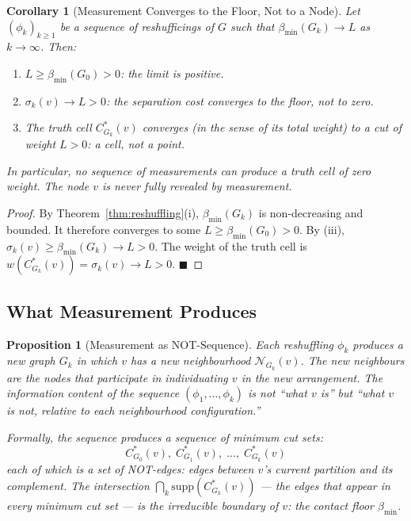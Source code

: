 \documentclass[12pt, a4paper]{article}
\theoremstyle{plain}
\newtheorem{corollary}[theorem]{Corollary}
\newtheorem{proposition}[theorem]{Proposition}
\theoremstyle{definition}
\theoremstyle{remark}
\newcommand{\Nbd}{\mathcal{N}}
\newcommand{\bmin}{\beta_{\min}}
\newcommand{\qed}{\hfill$\blacksquare$}
\begin{document}
\begin{corollary}[Measurement Converges to the Floor, Not to a Node]
\label{cor:convergence}
Let $(\phi_k)_{k \geq 1}$ be a sequence of reshufficings of $G$ such that
$\bmin(G_k) \to L$ as $k \to \infty$. Then:
\begin{enumerate}[label=(\roman*)]
  \item $L \geq \bmin(G_0) > 0$: the limit is positive.
  \item $\sigma_k(v) \to L > 0$: the separation cost converges to the
  floor, not to zero.
  \item The truth cell $C^*_{G_k}(v)$ converges (in the sense of its total
  weight) to a cut of weight $L > 0$: a cell, not a point.
\end{enumerate}
In particular, no sequence of measurements can produce a truth cell of zero
weight. The node $v$ is never fully revealed by measurement.
\end{corollary}

\begin{proof}
By Theorem~\ref{thm:reshuffling}(i), $\bmin(G_k)$ is non-decreasing and
bounded. It therefore converges to some $L \geq \bmin(G_0) > 0$. By (iii),
$\sigma_k(v) \geq \bmin(G_k) \to L > 0$. The weight of the truth cell is
$w(C^*_{G_k}(v)) = \sigma_k(v) \to L > 0$. \qed
\end{proof}

\subsection{What Measurement Produces}

\begin{proposition}[Measurement as NOT-Sequence]
\label{prop:not_sequence}
Each reshuffling $\phi_k$ produces a new graph $G_k$ in which $v$ has a new
neighbourhood $\Nbd_{G_k}(v)$. The new neighbours are the nodes that
participate in individuating $v$ in the new arrangement. The information
content of the sequence $(\phi_1, \ldots, \phi_k)$ is not ``what $v$ is''
but ``what $v$ is not, relative to each neighbourhood configuration.''

Formally, the sequence produces a sequence of minimum cut sets:
\[
  C^*_{G_0}(v),\; C^*_{G_1}(v),\; \ldots,\; C^*_{G_k}(v)
\]
each of which is a set of NOT-edges: edges between $v$'s current partition
and its complement. The intersection $\bigcap_{k} \mathrm{supp}(C^*_{G_k}(v))$
--- the edges that appear in every minimum cut set --- is the irreducible
boundary of $v$: the contact floor $\bmin$.
\end{proposition}
\end{document}
